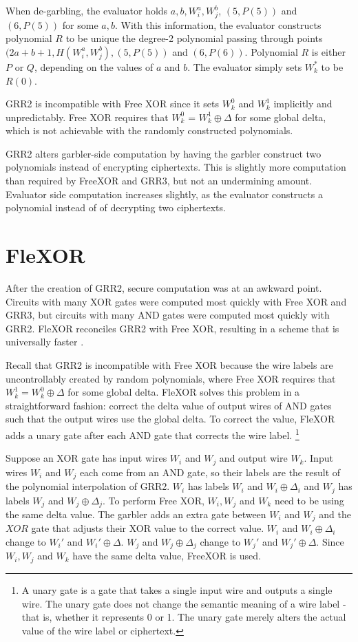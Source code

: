 When de-garbling, the evaluator holds $a, b, W_i^a, W_j^b$, $(5, P(5))$ and $(6, P(5))$ for some $a,b$.
With this information, the evaluator constructs polynomial $R$ to be unique the degree-2 polynomial passing through points $(2a + b + 1, H(W_i^a, W_j^b), (5, P(5))$ and $(6, P(6))$.
Polynomial $R$ is either $P$ or $Q$, depending on the values of $a$ and $b$.
The evaluator simply sets $W_k^*$ to be $R(0)$.

GRR2 is incompatible with Free XOR since it sets $W_k^0$ and $W_k^1$ implicitly and unpredictably.
Free XOR requires that $W_k^0$ = $W_k^1 \oplus \Delta$ for some global delta, which is not achievable with the randomly constructed polynomials.

GRR2 alters garbler-side computation by having the garbler construct two polynomials instead of encrypting ciphertexts.
This is slightly more computation than required by FreeXOR and GRR3, but not an undermining amount.
Evaluator side computation increases slightly, as the evaluator constructs a polynomial instead of of decrypting two ciphertexts.


\section{FleXOR}
After the creation of GRR2, secure computation was at an awkward point.
Circuits with many XOR gates were computed most quickly with Free XOR and GRR3, but circuits with many AND gates were computed most quickly with GRR2.
FleXOR reconciles GRR2 with Free XOR, resulting in a scheme that is universally faster \cite{flexor}.

Recall that GRR2 is incompatible with Free XOR because the wire labels are uncontrollably created by random polynomials, where Free XOR requires that $W_k^1 = W_k^0 \oplus \Delta$ for some global delta.
FleXOR solves this problem in a straightforward fashion: correct the delta value of output wires of AND gates such that the output wires use the global delta.
To correct the value, FleXOR adds a unary gate after each AND gate that corrects the wire label. \footnote{A unary gate is a gate that takes a single input wire and outputs a single wire. The unary gate does not change the semantic meaning of a wire label - that is, whether it represents 0 or 1. The unary gate merely alters the actual value of the wire label or ciphertext.}

Suppose an XOR gate has input wires $W_i$ and $W_j$ and output wire $W_k$.
Input wires $W_i$ and $W_j$ each come from an AND gate, so their labels are the result of the polynomial interpolation of GRR2.
$W_i$ has labels $W_i$ and $W_i \oplus \Delta_i$ and $W_j$ has labels $W_j$ and $W_j \oplus \Delta_j$.
To perform Free XOR, $W_i,W_j$ and $W_k$ need to be using the same delta value. 
The garbler adds an extra gate between $W_i$ and $W_j$ and the $XOR$ gate that adjusts their XOR value to the correct value.
$W_i$ and $W_i \oplus \Delta_i$ change to $W_i'$ and $W_i' \oplus \Delta$.
$W_j$ and $W_j \oplus \Delta_j$ change to $W_j'$ and $W_j' \oplus \Delta$.
Since $W_i, W_j$ and $W_k$ have the same delta value, FreeXOR is used.

